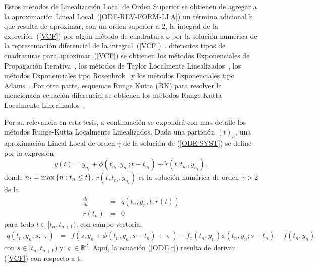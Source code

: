 Estos métodos de Linealización Local de Orden Superior se obtienen de agregar a la aproximación Lineal Local~(\ref{ODE-REV-FORM-LLA}) un término adicional $\widetilde{r}$ que resulta de aproximar, con un orden superior a 2, la integral de la expresión~(\ref{VCF}) por algún método de cuadratura o por la solución numérica de la representación diferencial de la integral~(\ref{VCF})~\cite{delaCruz06}.  diferentes tipos de cuadraturas para aproximar~(\ref{VCF}) se obtienen los métodos Exponenciales de Propagación 
Iterativa~\cite{tokman2006efficient}, los métodos de Taylor Localmente Linealizados~\cite{delaCruz07}, los
métodos Exponenciales tipo Rosenbrok~\cite{hochbruck2009exponential} y los métodos Exponenciales tipo Adams~\cite{hochbruck2011exponential}. Por otra parte,  esquemas Runge Kutta (RK) para resolver la mencionada ecuación diferencial se obtienen los métodos Runge-Kutta Localmente Linealizados~\cite{delaCruz06,Jimenez13,Jimenez14AMC}.

Por su relevancia en esta tesis, a continuación se expondrá con mas detalle los métodos Runge-Kutta Localmente Linealizados. 
Dada una partición $(t)_{h}$, una aproximación Lineal Local de orden $%
\gamma$ de la solución de (\ref{ODE-SYST}) se define por la expresión~\cite{Jimenez13}
\begin{equation}
y(t)=y_{n_{t}}+\phi(t_{n_{t}},y_{n_{t}};t-t_{n_{t}})+\widetilde{r}(t,t_{n_{t}},y_{n_{t}}),
\label{ODE-REV-HOLL}
\end{equation}
donde ${n_{t}=\max\left\{ n:t_{n}\leq t \right\}}$, $\widetilde{r}(t,t_{n_{t}},y_{n_{t}})$ es la solución numérica de orden $\gamma >2$ de la 
\begin{eqnarray}
\frac{dr}{dt} & = & q(t_{n},y_{n},t,r(t))  \label{ODE r} \\
r(t_{n}) & = & 0 \nonumber
\end{eqnarray}
para todo $t\in [t_{n},t_{n+1})$, con campo vectorial 
\begin{eqnarray*}
q(t_n,y_n,s,\varsigma)&=&f(s,y_n+\phi(t_n,y_n;s-t_n)+\varsigma)-f_x(t_n,y_n)\phi(t_n,y_n;s-t_n)-f(t_n,y_n)%
\end{eqnarray*}
con $s\in [t_{n},t_{n+1})$ y $\varsigma \in \mathbb{R}^d $. Aquí, la ecuación (\ref{ODE r}) resulta de derivar (\ref{VCF}) con respecto a t. 

